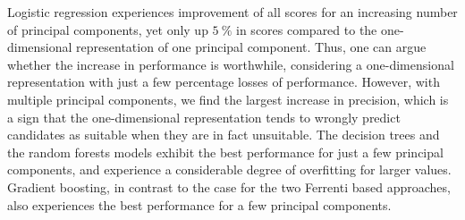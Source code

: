 \documentclass[superscriptaddress,unsortedaddress,
 amsmath,amssymb,
 aps,
]{revtex4-2}
\begin{document}
Logistic regression experiences improvement of all scores for an increasing number of principal components, yet only up $5 \ \%$ in scores compared to the one-dimensional representation of one principal component. Thus, one can argue whether the increase in performance is worthwhile, considering a one-dimensional representation with just a few percentage losses of performance. However, with multiple principal components, we find the largest increase in precision, which is a sign that the one-dimensional representation tends to wrongly predict candidates as suitable when they are in fact unsuitable. The decision trees and the random forests models exhibit the best performance for just a few principal components, and experience a considerable degree of overfitting for larger values. Gradient boosting, in contrast to the case for the two Ferrenti based approaches, also experiences the best performance for a few principal components.

\begin{table}[b]
\centering
\caption{ Optimal number of principal components and the respective scores (standard deviation) for each of the four ML models logistic regression (LOG), decision trees (DT), random forests (RF) and gradient boosting (GB) in the intuitive approach, as visualized by the dash-dotted line in Figure~\ref{fig:03-pca}.}
\label{tab:03-pca}
\noindent{}
\end{table}
\end{document}
